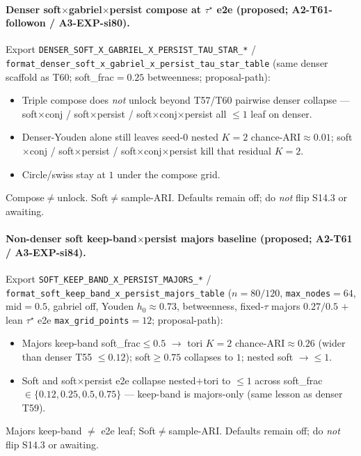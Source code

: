 \documentclass[11pt]{article}
\begin{document}
\paragraph{Denser soft$\times$gabriel$\times$persist compose at $\tau^\star$
e2e (proposed; A2-T61-followon / A3-EXP-si80).}
Export \texttt{DENSER\_SOFT\_X\_GABRIEL\_X\_PERSIST\_TAU\_STAR\_*} /
\texttt{format\_denser\_soft\_x\_gabriel\_x\_persist\_tau\_star\_table}
(same denser scaffold as T60; soft\_frac${=}0.25$ betweenness; proposal-path):
\begin{itemize}[leftmargin=1.5em]
  \item Triple compose does \emph{not} unlock beyond T57/T60 pairwise
  denser collapse --- soft$\times$conj / soft$\times$persist /
  soft$\times$conj$\times$persist all $\le 1$ leaf on denser.
  \item Denser-Youden alone still leaves seed-$0$ nested $K{=}2$
  chance-ARI$\approx 0.01$; soft$\times$conj / soft$\times$persist /
  soft$\times$conj$\times$persist kill that residual $K{=}2$.
  \item Circle/swiss stay at $1$ under the compose grid.
\end{itemize}
Compose$\neq$unlock. Soft$\neq$sample-ARI. Defaults remain off; do
\emph{not} flip S14.3 or awaiting.

\paragraph{Non-denser soft keep-band$\times$persist majors baseline
(proposed; A2-T61 / A3-EXP-si84).}
Export \texttt{SOFT\_KEEP\_BAND\_X\_PERSIST\_MAJORS\_*} /
\texttt{format\_soft\_keep\_band\_x\_persist\_majors\_table}
($n{=}80/120$, \texttt{max\_nodes}${=}64$, mid${=}0.5$, gabriel off,
Youden $h_0\approx 0.73$, betweenness, fixed-$\tau$ majors $0.27/0.5$ $+$
lean $\tau^\star$ e2e \texttt{max\_grid\_points}${=}12$; proposal-path):
\begin{itemize}[leftmargin=1.5em]
  \item Majors keep-band soft\_frac$\le 0.5$ $\to$ tori $K{=}2$
  chance-ARI$\approx 0.26$ (wider than denser T55 $\le 0.12$);
  soft$\ge 0.75$ collapses to $1$; nested soft $\to\le 1$.
  \item Soft and soft$\times$persist e2e collapse nested$+$tori to
  $\le 1$ across soft\_frac$\in\{0.12,0.25,0.5,0.75\}$ --- keep-band is
  majors-only (same lesson as denser T59).
\end{itemize}
Majors keep-band $\neq$ e2e leaf; Soft$\neq$sample-ARI. Defaults remain
off; do \emph{not} flip S14.3 or awaiting.
\end{document}
